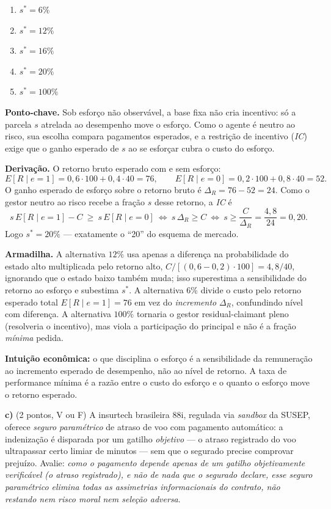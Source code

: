 \begin{enumerate}[label=\Alph*., leftmargin=3.2em, itemsep=0.15em, topsep=0.2em]
  \item $s^{*}=6\%$
  \item $s^{*}=12\%$
  \item $s^{*}=16\%$
  \item $s^{*}=20\%$
  \item $s^{*}=100\%$
\end{enumerate}
\begin{solucao}
\textbf{Ponto-chave.} Sob esforço não observável, a base fixa não cria incentivo: só a parcela $s$ atrelada ao desempenho move o esforço. Como o agente é neutro ao risco, sua escolha compara pagamentos esperados, e a restrição de incentivo (\emph{IC}) exige que o ganho esperado de $s$ ao se esforçar cubra o custo do esforço.

\textbf{Derivação.} O retorno bruto esperado com e sem esforço:
\[
E[R\mid e=1] = 0{,}6\cdot 100 + 0{,}4\cdot 40 = 76,\qquad
E[R\mid e=0] = 0{,}2\cdot 100 + 0{,}8\cdot 40 = 52.
\]
O ganho esperado de esforço sobre o retorno bruto é $\Delta_R = 76 - 52 = 24$. Como o gestor neutro ao risco recebe a fração $s$ desse retorno, a \emph{IC} é
\[
s\,E[R\mid e=1] - C \ \ge\ s\,E[R\mid e=0]
\ \Longleftrightarrow\ s\,\Delta_R \ge C
\ \Longleftrightarrow\ s \ge \frac{C}{\Delta_R} = \frac{4{,}8}{24} = 0{,}20.
\]
Logo $s^{*}=20\%$ --- exatamente o ``20'' do esquema de mercado.

\textbf{Armadilha.} A alternativa $12\%$ usa apenas a diferença na probabilidade do estado alto multiplicada pelo retorno alto, $C/[(0{,}6-0{,}2)\cdot 100]=4{,}8/40$, ignorando que o estado baixo também muda; isso superestima a sensibilidade do retorno ao esforço e subestima $s^{*}$. A alternativa $6\%$ divide o custo pelo retorno esperado total $E[R\mid e=1]=76$ em vez do \emph{incremento} $\Delta_R$, confundindo nível com diferença. A alternativa $100\%$ tornaria o gestor residual-claimant pleno (resolveria o incentivo), mas viola a participação do principal e não é a fração \emph{mínima} pedida.

\textbf{Intuição econômica:} o que disciplina o esforço é a sensibilidade da remuneração ao incremento esperado de desempenho, não ao nível de retorno. A taxa de performance mínima é a razão entre o custo do esforço e o quanto o esforço move o retorno esperado.
\end{solucao}

\textbf{c)} (2 pontos, V ou F) A insurtech brasileira 88i, regulada via \emph{sandbox} da SUSEP, oferece \emph{seguro paramétrico} de atraso de voo com pagamento automático: a indenização é disparada por um gatilho \emph{objetivo} --- o atraso registrado do voo ultrapassar certo limiar de minutos --- sem que o segurado precise comprovar prejuízo. Avalie: \emph{como o pagamento depende apenas de um gatilho objetivamente verificável (o atraso registrado), e não de nada que o segurado declare, esse seguro paramétrico elimina todas as assimetrias informacionais do contrato, não restando nem risco moral nem seleção adversa}.

